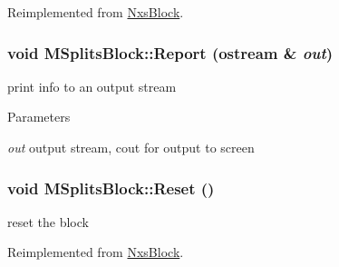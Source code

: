 Reimplemented from \hyperlink{classNxsBlock}{NxsBlock}.\hypertarget{classMSplitsBlock_a693bbbb86942e0ede5f21e2aa9caf008}{
\subsubsection[{Report}]{\setlength{\rightskip}{0pt plus 5cm}void MSplitsBlock::Report (ostream \& {\em out})}}
\label{classMSplitsBlock_a693bbbb86942e0ede5f21e2aa9caf008}
print info to an output stream 
\begin{DoxyParams}{Parameters}
\item[{\em out}]output stream, cout for output to screen \end{DoxyParams}
\hypertarget{classMSplitsBlock_ab05dcffb5cbb74d05a809e1ca81d7e23}{
\subsubsection[{Reset}]{\setlength{\rightskip}{0pt plus 5cm}void MSplitsBlock::Reset ()}}
\label{classMSplitsBlock_ab05dcffb5cbb74d05a809e1ca81d7e23}
reset the block 

Reimplemented from \hyperlink{classNxsBlock}{NxsBlock}.

